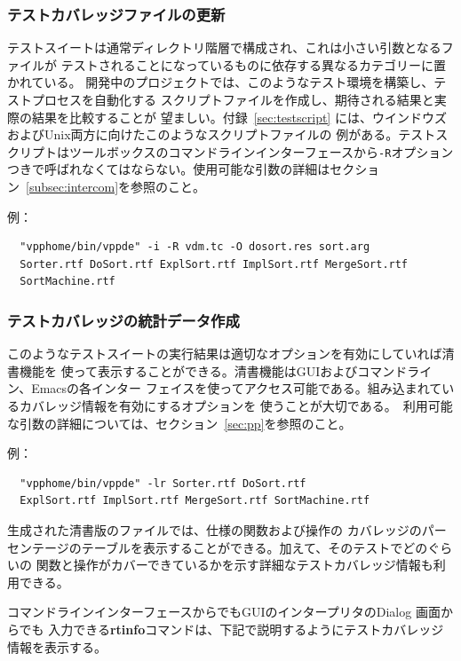 \documentclass[\pformat,12pt]{jarticle}
\newcommand{\guicmd}[1]{{\gt #1}}
\begin{document}
\subsubsection{テストカバレッジファイルの更新}

テストスイートは通常ディレクトリ階層で構成され、これは小さい引数となるファイルが
テストされることになっているものに依存する異なるカテゴリーに置かれている。
開発中のプロジェクトでは、このようなテスト環境を構築し、テストプロセスを自動化する
スクリプトファイルを作成し、期待される結果と実際の結果を比較することが
望ましい。付録~\ref{sec:testscript} には、ウインドウズおよびUnix両方に向けたこのようなスクリプトファイルの
例がある。テストスクリプトはツールボックスのコマンドラインインターフェースから{\tt -R}オプション
つきで呼ばれなくてはならない。使用可能な引数の詳細はセクション~\ref{subsec:intercom}を参照のこと。

例：
\begin{verbatim}
  "vpphome/bin/vppde" -i -R vdm.tc -O dosort.res sort.arg 
  Sorter.rtf DoSort.rtf ExplSort.rtf ImplSort.rtf MergeSort.rtf 
  SortMachine.rtf 
\end{verbatim}

\subsubsection{テストカバレッジの統計データ作成}

このようなテストスイートの実行結果は適切なオプションを有効にしていれば清書機能を
使って表示することができる。清書機能はGUIおよびコマンドライン、Emacsの各インター
フェイスを使ってアクセス可能である。組み込まれているカバレッジ情報を有効にするオプションを
使うことが大切である。　利用可能な引数の詳細については、セクション~\ref{sec:pp}を参照のこと。

例：
\begin{verbatim}
  "vpphome/bin/vppde" -lr Sorter.rtf DoSort.rtf
  ExplSort.rtf ImplSort.rtf MergeSort.rtf SortMachine.rtf
\end{verbatim}


生成された清書版のファイルでは、仕様の関数および操作の
カバレッジのパーセンテージのテーブルを表示することができる。加えて、そのテストでどのぐらいの
関数と操作がカバーできているかを示す詳細なテストカバレッジ情報も利用できる。

コマンドラインインターフェースからでもGUIのインタープリタの\guicmd{Dialog} 画面からでも
入力できる\textbf{rtinfo}コマンドは、下記で説明するようにテストカバレッジ情報を表示する。
\end{document}
